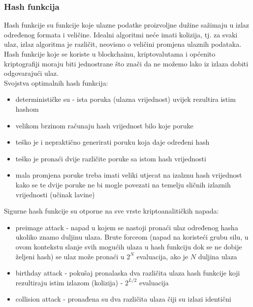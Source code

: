 \documentclass[12pt]{article}
\begin{document}
\subsubsection{Hash funkcija}
Hash funkcije su funkcije koje ulazne podatke proizvoljne dužine sažimaju u izlaz određenog formata i veličine. Idealni algoritmi neće imati kolizija, tj. za svaki ulaz, izlaz algoritma je različit, neovisno o veličini promjena ulaznih podataka.\\
Hash funkcije koje se koriste u blockchainu, kriptovalutama i općenito kriptografiji moraju biti jednostrane što znači da ne možemo lako iz izlaza dobiti odgovarajući ulaz.\\
Svojstva optimalnih hash funkcija:
\begin{itemize}
	\item determinističke su - ista poruka (ulazna vrijednost) uvijek rezultira istim hashom
	\item velikom brzinom računaju hash vrijednost bilo koje poruke
	\item teško je i nepraktično generirati poruku koja daje određeni hash
	\item teško je pronaći dvije različite poruke sa istom hash vrijednosti
	\item mala promjena poruke treba imati veliki utjecat na izalznu hash vrijednost kako se te dvije poruke ne bi mogle povezati na temelju sličnih izlaznih vrijednosti (učinak lavine)\cite{ideal-hash-fun}
\end{itemize}
%
Sigurne hash funkcije su otporne na sve vrste kriptoanalitičkih napada:
\begin{itemize}
	\item preimage attack - napad u kojem se nastoji pronaći ulaz određenog hasha ukoliko znamo duljinu ulaza. Brute forceom (napad na koristeći grubu silu, u ovom kontekstu slanje svih mogućih ulaza u hash funkciju dok se ne dobije željeni hash) se ulaz može pronaći u $2^N$ evaluacija, ako je $N$ duljina ulaza
	\item birthday attack - pokušaj pronalaska dva različita ulaza hash funkcije koji rezultiraju istim izlazom (kolizija) - $2^{L/2}$ evaluacija
	\item collision attack - pronađena su dva različita ulaza čiji su izlazi identični
\end{itemize}
\end{document}
